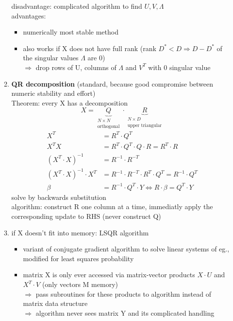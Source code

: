 \documentclass[11pt]{article}
\begin{document}
\begin{itemize}
\begin{enumerate}
        disadvantage: complicated algorithm to find $U, V, \Lambda$ \\
        advantages: \begin{itemize}
          \item numerically most stable method
          \item also works if X does not have full rank (rank $D^* < D \Rightarrow
          D-D^*$ of the singular values $\Lambda$ are 0) \\
          $\Rightarrow$ drop rows of U, columns of $\Lambda$ and $V^T$ with 0
          singular value
        \end{itemize}
        \item \textbf{QR decomposition} (standard, because good compromise between
        numeric stability and effort) \\
        Theorem: every X has a decomposition
        \begin{equation*}
          X = \underbrace{Q}_{\substack{N \times N \\ \text{orthogonal}}} \cdot
          \underbrace{R}_{\substack{N \times D \\ \text{upper triangular}}}
        \end{equation*}
        \begin{equation*}
          \begin{align*}
            X^T &= R^T \cdot Q^T \\
            X^TX &= R^T\cdot Q^T\cdot Q \cdot R = R^T\cdot R \\
            (X^T \cdot X)^{-1} &= R^{-1}\cdot R^{-T} \\
            (X^T\cdot X)^{-1}\cdot X^T &= R^{-1} \cdot R^{-T} \cdot R^T \cdot Q^T =
            R^{-1} \cdot Q^T \\
            \beta &= R^{-1} \cdot Q^T\cdot Y \iff R\cdot \beta = Q^T \cdot Y
          \end{align*}
        \end{equation*}
        solve by backwards substitution \\
        algorithm: construct R one column at a time, immediatly apply the corresponding
        update to RHS (never construct Q)
        \item if X doesn't fit into memory: LSQR algorithm
        \begin{itemize}
          \item variant of conjugate gradient algorithm to solve linear systems of eg., modified for least squares
          probability
          \item matrix X is only ever accessed via matrix-vector products
          $X \cdot U$ and $X^T \cdot V$ (only vectors M memory) \\
          $\Rightarrow$ pass subroutines for these products to algorithm instead
          of matrix data structure \\
          $\Rightarrow$ algorithm never sees matrix Y and its complicated handling
        \end{itemize}
      \end{enumerate}

\end{itemize}
\end{document}
